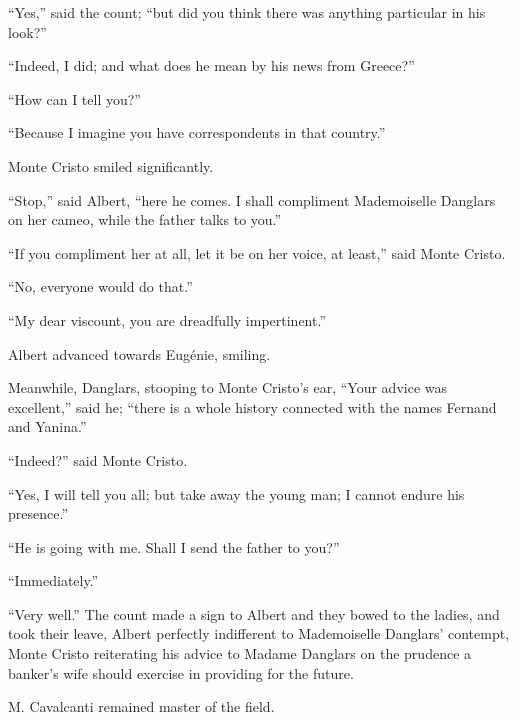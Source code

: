 “Yes,” said the count; “but did you think there was anything particular
in his look?”

“Indeed, I did; and what does he mean by his news from Greece?”

“How can I tell you?”

“Because I imagine you have correspondents in that country.”

Monte Cristo smiled significantly.

“Stop,” said Albert, “here he comes. I shall compliment Mademoiselle
Danglars on her cameo, while the father talks to you.”

“If you compliment her at all, let it be on her voice, at least,” said
Monte Cristo.

“No, everyone would do that.”

“My dear viscount, you are dreadfully impertinent.”

Albert advanced towards Eugénie, smiling.

Meanwhile, Danglars, stooping to Monte Cristo’s ear, “Your advice was
excellent,” said he; “there is a whole history connected with the names
Fernand and Yanina.”

“Indeed?” said Monte Cristo.

“Yes, I will tell you all; but take away the young man; I cannot endure
his presence.”

“He is going with me. Shall I send the father to you?”

“Immediately.”

“Very well.” The count made a sign to Albert and they bowed to the
ladies, and took their leave, Albert perfectly indifferent to
Mademoiselle Danglars’ contempt, Monte Cristo reiterating his advice to
Madame Danglars on the prudence a banker’s wife should exercise in
providing for the future.

M. Cavalcanti remained master of the field.
